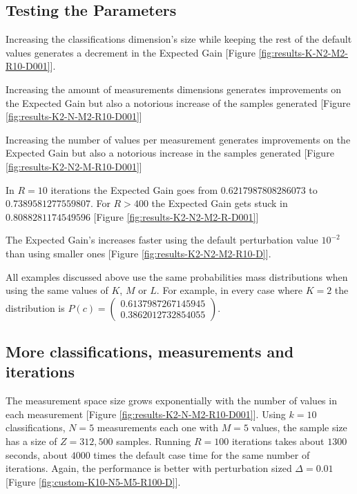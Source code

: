 \documentclass[letterpaper, conference]{IEEEtran}
\begin{document}
\subsection{Testing the Parameters}

Increasing the classifications dimension's size while keeping the rest of the default values generates a decrement in the Expected Gain [Figure \ref{fig:results-K-N2-M2-R10-D001}].



Increasing the amount of measurements dimensions generates improvements on the Expected Gain but also a notorious increase of the samples generated [Figure \ref{fig:results-K2-N-M2-R10-D001}]



Increasing the number of values per measurement generates improvements on the Expected Gain but also a notorious increase in the samples generated [Figure \ref{fig:results-K2-N2-M-R10-D001}]



In $R = 10$ iterations the Expected Gain goes from $0.6217987808286073$ to $0.7389581277559807$. For $R > 400$ the Expected Gain gets stuck in $0.8088281174549596$ [Figure \ref{fig:results-K2-N2-M2-R-D001}]



The Expected Gain's increases faster using the default perturbation value $10^{-2}$ than using smaller ones [Figure \ref{fig:results-K2-N2-M2-R10-D}].



All examples discussed above use the same probabilities mass distributions when using the same values of $K$, $M$ or $L$. For example, in every case where $K = 2$ the distribution is $P(c) = \begin{pmatrix}0.6137987267145945\\0.3862012732854055\end{pmatrix}$.

\subsection{More classifications, measurements and iterations}

The measurement space size grows exponentially with the number of values in each measurement [Figure \ref{fig:results-K2-N-M2-R10-D001}]. Using $k =10$ classifications, $N = 5$ measurements each one with $M = 5$ values, the sample size has a size of $Z = 312,500$ samples. Running $R = 100$ iterations takes about $1300$ seconds, about $4000$ times the default case time for the same number of iterations. Again, the performance is better with perturbation sized $\Delta = 0.01$ [Figure \ref{fig:custom-K10-N5-M5-R100-D}].
\end{document}

